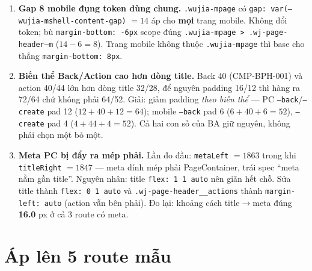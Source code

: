 \begin{enumerate}
\item \textbf{Gap 8 mobile đụng token dùng chung.} \texttt{.wujia-mpage} có
  \texttt{gap: var(--wujia-mshell-content-gap)} $=14$ áp cho \textbf{mọi} trang mobile. Không
  đổi token; bù \texttt{margin-bottom: -6px} scope đúng
  \texttt{.wujia-mpage > .wj-page-header--m} ($14-6=8$). Trang mobile không thuộc
  \texttt{.wujia-mpage} thì base cho thẳng \texttt{margin-bottom: 8px}.
\item \textbf{Biến thể Back/Action cao hơn dòng title.} Back 40 (CMP-BPH-001) và action 40/44
  lớn hơn dòng title 32/28, để nguyên padding 16/12 thì hàng ra 72/64 chứ không phải 64/52.
  Giải: giảm padding \emph{theo biến thể} --- PC \texttt{--back}/\texttt{--create} pad 12
  ($12+40+12=64$); mobile \texttt{--back} pad 6 ($6+40+6=52$), \texttt{--create} pad 4
  ($4+44+4=52$). Cả hai con số của BA giữ nguyên, không phải chọn một bỏ một.
\item \textbf{Meta PC bị đẩy ra mép phải.} Lần đo đầu: \texttt{metaLeft} $=1863$ trong khi
  \texttt{titleRight} $=1847$ --- meta dính mép phải PageContainer, trái spec ``meta nằm gần
  title''. Nguyên nhân: title \texttt{flex: 1 1 auto} nên giãn hết chỗ. Sửa title thành
  \texttt{flex: 0 1 auto} và \texttt{.wj-page-header\_\_actions} thành
  \texttt{margin-left: auto} (action vẫn bên phải). Đo lại: khoảng cách title$\rightarrow$meta
  đúng \textbf{16.0} px ở cả 3 route có meta.
\end{enumerate}

\section{Áp lên 5 route mẫu}

